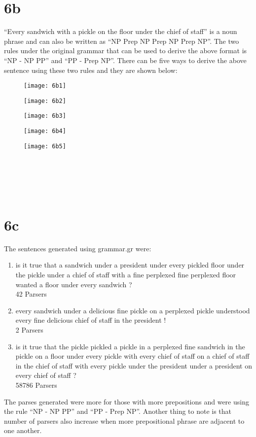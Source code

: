 \documentclass[12pt]{article}
\begin{document}
\section*{6b}
``Every sandwich with a pickle on the floor under the chief of staff” is a noun phrase and can also be written as “NP Prep NP Prep NP Prep NP”. The two rules under the original grammar that can be used to derive the above format is “NP - NP PP” and “PP - Prep NP”. There can be five ways to derive the above sentence using these two rules and they are shown below:\\
\begin{figure}[h]
	\label{fig:6b1}
	\texttt{[image: 6b1]}
\end{figure}
\begin{figure}[h]
	\label{fig:6b2}
	\texttt{[image: 6b2]}
\end{figure}
\begin{figure}[h]
	\label{fig:6b3}
	\texttt{[image: 6b3]}
\end{figure}
\begin{figure}[h]
	\label{fig:6b4}
	\texttt{[image: 6b4]}
\end{figure}
\begin{figure}[h]
	\label{fig:6b5}
	\texttt{[image: 6b5]}
\end{figure}
\pagebreak
\\
\\
\pagebreak
\\
\\
\pagebreak
\section*{6c}
The sentences generated using grammar.gr were:\\
\begin{enumerate}
\item is  it true  that a sandwich  under a president  under every pickled  floor under the pickle  under a chief of staff with  a fine perplexed fine perplexed  floor wanted a floor under every  sandwich ?\\
42 Parsers\\
\item every  sandwich  under a delicious  fine pickle on a perplexed  pickle understood every fine delicious  chief of staff in the president !\\
2 Parsers\\
\item is  it true  that the pickle  pickled a pickle in  a perplexed fine sandwich  in the pickle on a floor under  every pickle with every chief of staff  on a chief of staff in the chief of staff  with every pickle under the president under a  president on every chief of staff ?\\
58786 Parsers\\
\end{enumerate}
The parses generated were more for those with more prepositions and were using the rule “NP - NP PP” and “PP - Prep NP”.  Another thing to note is that number of parsers also increase when more prepositional phrase are adjacent to one another.\\
\pagebreak
\end{document}
